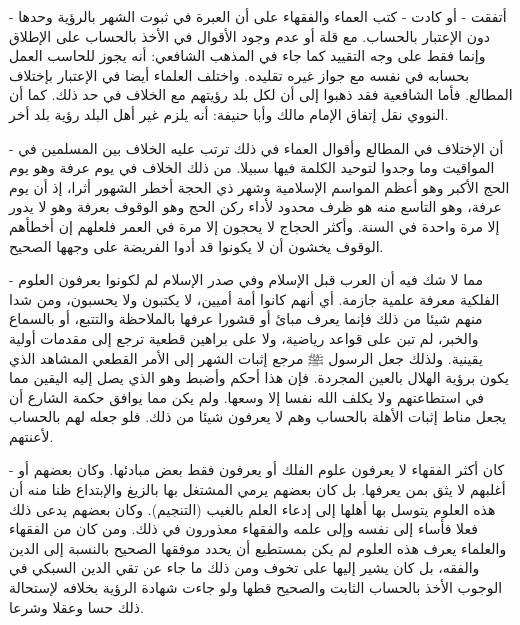 - أتفقت - أو كادت - كتب العماء والفقهاء على أن العبرة في ثبوت الشهر بالرؤية وحدها دون الإعتبار بالحساب. مع قلة أو عدم وجود الأقوال في الأخذ بالحساب على الإطلاق وإنما فقط على وجه التقييد كما جاء في المذهب الشافعي: أنه يجوز للحاسب العمل بحسابه في نفسه مع جواز غيره تقليده. واختلف العلماء أيضا في الإعتبار بإختلاف المطالع. فأما الشافعية فقد ذهبوا إلى أن لكل بلد رؤيتهم مع الخلاف في حد ذلك. كما أن النووي نقل إتفاق الإمام مالك وأبا حنيفة: أنه يلزم غير أهل البلد رؤية بلد أخر.

- أن الإختلاف في المطالع وأقوال العماء في ذلك ترتب عليه الخلاف بين المسلمين في المواقيت وما وجدوا لتوحيد الكلمة فيها سبيلا. من ذلك الخلاف في يوم عرفة وهو يوم الحج الأكبر وهو أعظم المواسم الإسلامية وشهر ذي الحجة أخطر الشهور أثرا، إذ أن يوم عرفة، وهو التاسع منه هو ظرف محدود لأداء ركن الحج وهو الوقوف بعرفة وهو لا يدور إلا مرة واحدة في السنة. وأكثر الحجاج لا يحجون إلا مرة في العمر فلعلهم إن أخطأهم الوقوف يخشون أن لا يكونوا قد أدوا الفريضة على وجهها الصحيح. 

- مما لا شك فيه أن العرب قبل الإسلام وفي صدر الإسلام لم لكونوا يعرفون العلوم الفلكية معرفة علمية جازمة. أي أنهم كانوا أمة أميين، لا يكتبون ولا يحسبون، ومن شدا منهم شيئا من ذلك فإنما يعرف مبائ أو قشورا عرفها بالملاحظة والتتبع، أو بالسماع والخبر، لم تبن على قواعد رياضية، ولا على براهين قطعية ترجع إلى مقدمات أولية يقينية. ولذلك جعل الرسول ﷺ مرجع إثبات الشهر إلى الأمر القطعي المشاهد الذي يكون برؤية الهلال بالعين المجردة. فإن هذا أحكم وأضبط وهو الذي يصل إليه اليقين مما في استطاعتهم ولا يكلف الله نفسا إلا وسعها. ولم يكن مما يوافق حكمة الشارع أن يجعل مناط إثبات الأهلة بالحساب وهم لا يعرفون شيئا من ذلك. فلو جعله لهم بالحساب لأعنتهم.

- كان أكثر الفقهاء لا يعرفون علوم الفلك أو يعرفون فقط بعض مبادئها. وكان بعضهم أو أغلبهم لا يثق بمن يعرفها. بل كان بعضهم يرمي المشتغل بها بالزيغ والإبتداع ظنا منه أن هذه العلوم يتوسل بها أهلها إلى إدعاء العلم بالغيب (التنجيم). وكان بعضهم يدعى ذلك فعلا فأساء إلى نفسه وإلى علمه والفقهاء معذورون في ذلك. ومن كان من الفقهاء والعلماء يعرف هذه العلوم لم يكن بمستطيع أن يحدد موفقها الصحيح بالنسبة إلى الدين والفقه، بل كان يشير إليها على تخوف ومن ذلك ما جاء عن تقي الدين السبكي في الوجوب الأخذ بالحساب الثابت والصحيح قطها ولو جاءت شهادة الرؤية بخلافه لإستحالة ذلك حسا وعقلا وشرعا.






























